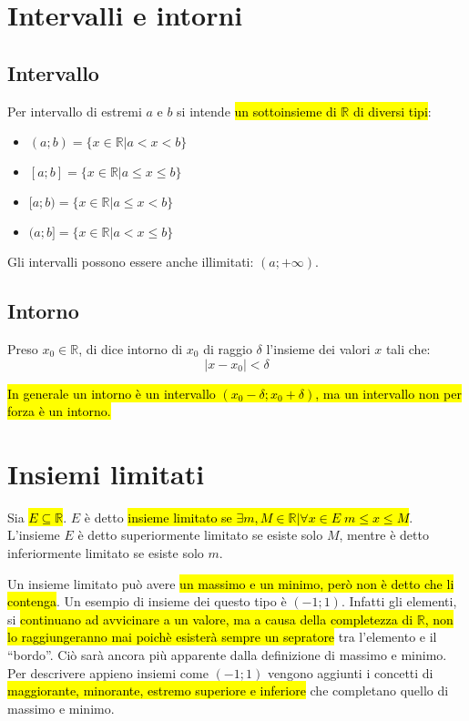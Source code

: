 \section{Intervalli e intorni}
\subsection{Intervallo}
Per intervallo di estremi $a$ e $b$ si intende \hl{un sottoinsieme di
$\mathbb{R}$ di diversi tipi}:
\begin{itemize}
    \item $(a;b) = \{ x\in\mathbb{R}|a<x<b\}$
    \item $[a;b] = \{ x\in\mathbb{R}|a \leq x \leq b\}$
    \item $[a;b) = \{ x\in\mathbb{R}|a \leq x < b\}$
    \item $(a;b] = \{ x\in\mathbb{R}|a < x \leq b\}$
\end{itemize}

Gli intervalli possono essere anche illimitati: $(a; +\infty)$.

\subsection{Intorno}
Preso $x_0 \in \mathbb{R}$, di dice intorno di $x_0$ di raggio $\delta$ 
l'insieme dei valori $x$ tali che:
\[ |x - x_0| < \delta \]

\hl{In generale un intorno è un intervallo $(x_0 - \delta; x_0 + \delta)$, ma un
intervallo non per forza è un intorno.}

\section{Insiemi limitati}
Sia \hl{$E \subseteq \mathbb{R}$}. $E$ è detto \hl{insieme limitato se 
$\exists m,M \in \mathbb{R} | \forall x \in E \; m \leq x \leq M$}. L'insieme 
$E$ è detto superiormente limitato se esiste solo $M$, mentre è detto 
inferiormente limitato se esiste solo $m$.

Un insieme limitato può avere \hl{un massimo e un minimo, però non è detto
che li contenga}. Un esempio di insieme dei questo tipo è $(-1; 1)$. Infatti 
gli elementi, si \hl{continuano ad avvicinare a un valore, ma a causa della
completezza di $\mathbb{R}$, non lo raggiungeranno mai poichè esisterà sempre 
un sepratore} tra l'elemento e il ``bordo''. Ciò sarà ancora più apparente dalla
definizione di massimo e minimo. Per descrivere appieno insiemi come $(-1;1)$
vengono aggiunti i concetti di \hl{maggiorante, minorante, estremo superiore e 
inferiore} che completano quello di massimo e minimo.

